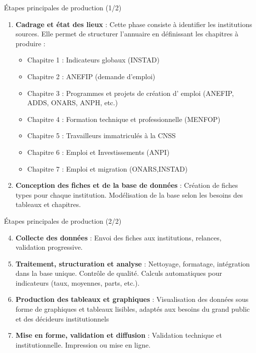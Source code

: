 \documentclass{beamer}
\begin{document}
\begin{frame}{Étapes principales de production (1/2)}
\begin{enumerate}
  \item \textbf{Cadrage et état des lieux} : Cette phase consiste à identifier les institutions sources. Elle permet de structurer l’annuaire en définissant les chapitres à produire :
    \begin{itemize}
      \item Chapitre 1 : Indicateurs globaux (INSTAD)
      \item Chapitre 2 : ANEFIP (demande d’emploi)
      \item Chapitre 3 : Programmes et projets de création d' emploi (ANEFIP, ADDS, ONARS, ANPH, etc.)
      \item Chapitre 4 : Formation technique et professionnelle (MENFOP)
      \item Chapitre 5 : Travailleurs immatriculés à la CNSS
      \item Chapitre 6 : Emploi et Investissements (ANPI)
      \item Chapitre 7 : Emploi et migration (ONARS,INSTAD)
    \end{itemize}
  \item \textbf{Conception des fiches et de la base de données} : Création de fiches types pour chaque institution. Modélisation de la base selon les besoins des tableaux et chapitres.
  
\end{enumerate}
\end{frame}

\begin{frame}{Étapes principales de production (2/2)}
\begin{enumerate}
  \setcounter{enumi}{3}
  \item \textbf{Collecte des données} : Envoi des fiches aux institutions, relances, validation progressive.
  \item \textbf{Traitement, structuration et analyse} : Nettoyage, formatage, intégration dans la base unique. Contrôle de qualité. Calculs automatiques pour indicateurs (taux, moyennes, parts, etc.).
  \item \textbf{Production des tableaux et graphiques} : Visualisation des données sous forme de graphiques et tableaux lisibles, adaptés aux besoins du grand public et des décideurs institutionnels
  \item \textbf{Mise en forme, validation et diffusion} : Validation technique et institutionnelle. Impression ou mise en ligne.
\end{enumerate}
\end{frame}
\end{document}
